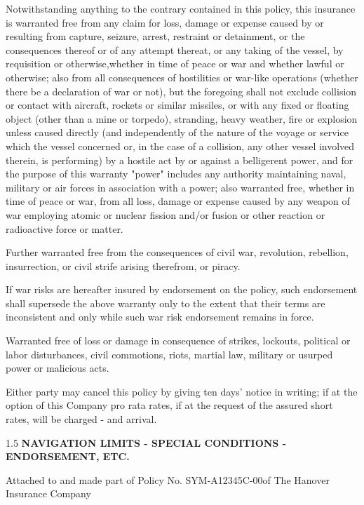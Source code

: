 \documentclass[10pt]{article}
\newenvironment{changemargin}[2]{%
  \begin{list}{}{%
    \setlength{\topsep}{0pt}%
    \setlength{\leftmargin}{#1}%
    \setlength{\rightmargin}{#2}%
    \setlength{\listparindent}{\parindent}%
    \setlength{\itemindent}{\parindent}%
    \setlength{\parsep}{\parskip}%
  }%
  \item[]}{\end{list}}
\newcommand{\centerbold}[1] {
\begin{changemargin}{2cm}{2cm}
  \begin{center}
    \begin{spacing}{1.5}
    {\textbf{#1}}
    \end{spacing}
  \end{center} 
\end{changemargin}
}
\newcommand{\policynum}{SYM-A12345C-00}
\begin{document}
\begin{linenumbers}
Notwithstanding   anything   to   the   contrary   contained   in   this   policy,   this  insurance   is   warranted free from  any  claim  for  loss,  damage  or  expense  caused  by  or  resulting  from  capture,  seizure,  arrest,  restraint  or  detainment,	or  the  consequences  thereof  or  of  any  attempt  thereat,  or  any  taking  of  the  vessel,  by  requisition  or  otherwise,whether  in  time  of  peace  or  war  and  whether  lawful  or  otherwise;  also  from  all  consequences  of  hostilities  or  war-like  operations (whether  there  be  a  declaration  of   war  or  not),  but  the  foregoing  shall  not  exclude  collision  or contact   with   aircraft,   rockets   or   similar   missiles,   or   with   any   fixed   or   floating   object (other   than   a   mine   or torpedo),  stranding,  heavy  weather,  fire  or  explosion  unless  caused  directly (and   independently   of   the   nature   of the  voyage  or  service  which  the  vessel  concerned  or,  in  the  case  of  a  collision,  any  other  vessel  involved  therein, is  performing)  by  a  hostile  act  by  or  against  a  belligerent  power,  and  for  the  purpose  of  this  warranty  "power" includes  any  authority  maintaining  naval,  military  or  air  forces  in  association  with  a  power;  also  warranted  free, whether  in  time  of  peace  or  war,  from  all  loss,  damage  or  expense  caused  by  any  weapon  of  war  employing  atomic or nuclear fission and/or fusion or other reaction or radioactive force or matter.

Further  warranted  free  from  the  consequences  of  civil  war,  revolution,  rebellion,  insurrection,  or  civil  strife arising therefrom, or piracy.

If  war  risks  are  hereafter  insured  by  endorsement  on  the  policy,  such  endorsement  shall  supersede  the  above warranty  only  to  the  extent  that  their  terms  are  inconsistent  and  only   while  such  war  risk   endorsement  remains in force.

Warranted   free   of   loss   or   damage   in   consequence   of   strikes,   lockouts,   political   or   labor   disturbances,   civil commotions, riots, martial law, military or usurped power or malicious acts.

Either  party  may  cancel  this  policy  by  giving  ten  days'  notice  in  writing;  if  at  the  option  of  this  Company pro rata rates, if at the request of the assured short rates, will be charged - and arrival.

\centerbold{NAVIGATION LIMITS - SPECIAL CONDITIONS - ENDORSEMENT, ETC.}

Attached to and made part of Policy No. \policynum of The Hanover Insurance Company

\end{linenumbers}
\end{document}
